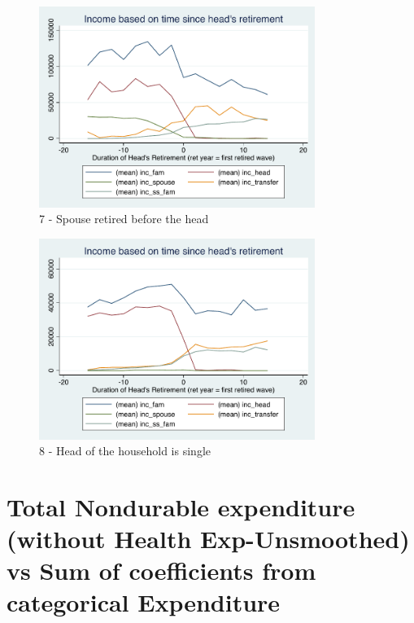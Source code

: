 \documentclass[11pt,onecolumn]{article}
\numberwithin{figure}{section}
\begin{document}
\begin{figure}[h]
	\caption{7 - Spouse retired before the head}
	\centering
	\includegraphics[width=0.8\textwidth]{../IncomeAroundRetirement/Income_with_spouse_definition_7.pdf}
\end{figure}

\begin{figure}[h]
	\caption{8 - Head of the household is single}
	\centering
	\includegraphics[width=0.8\textwidth]{../IncomeAroundRetirement/Income_with_spouse_definition_8.pdf}
\end{figure}

\clearpage

\section{Total Nondurable expenditure (without Health Exp-Unsmoothed) vs Sum of coefficients from categorical Expenditure}
\end{document}
